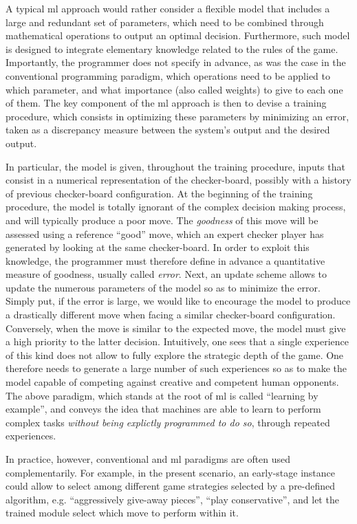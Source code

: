 A typical \gls{ml} approach would rather consider a flexible model that includes a large and redundant set of parameters, which need to be combined through mathematical operations to output an optimal decision.
Furthermore, such model is designed to integrate elementary knowledge related to the rules of the game.
Importantly, the programmer does not specify in advance, as was the case in the conventional programming paradigm, which operations need to be applied to which parameter, and what importance (also called weights) to give to each one of them.
The key component of the \gls{ml} approach is then to devise a training procedure, which consists in optimizing these parameters by minimizing an error, taken as a discrepancy measure between the system's output and the desired output.

In particular, the model is given, throughout the training procedure, inputs that consist in a numerical representation of the checker-board, possibly with a history of previous checker-board configuration.
At the beginning of the training procedure, the model is totally ignorant of the complex decision making process, and will typically produce a poor move.
The \textit{goodness} of this move will be assessed using a reference ``good'' move, which an expert checker player has generated by looking at the same checker-board.
In order to exploit this knowledge, the programmer must therefore define in advance a quantitative measure of goodness, usually called \textit{error}.
Next, an update scheme allows to update the numerous parameters of the model so as to minimize the error.
Simply put, if the error is large, we would like to encourage the model to produce a drastically different move when facing a similar checker-board configuration.
Conversely, when the move is similar to the expected move, the model must give a high priority to the latter decision.
Intuitively, one sees that a single experience of this kind does not allow to fully explore the strategic depth of the game.
One therefore needs to generate a large number of such experiences so as to make the model capable of competing against creative and competent human opponents.
The above paradigm, which stands at the root of \gls{ml} is called ``learning by example'', and conveys the idea that machines are able to learn to perform complex tasks \textit{without being explictly programmed to do so}, through repeated experiences.

In practice, however, conventional and \gls{ml} paradigms are often used complementarily.
For example, in the present scenario, an early-stage instance could allow to select among different game strategies selected by a pre-defined algorithm, e.g. ``aggressively give-away pieces'', ``play conservative'', and let the trained module select which move to perform within it.

